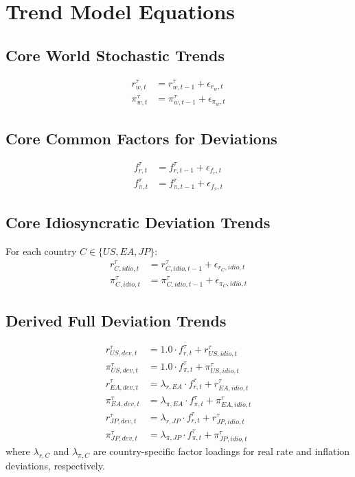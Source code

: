 \documentclass{article}
\begin{document}
\section*{Trend Model Equations}

\subsection*{Core World Stochastic Trends}
\begin{align}
r_{w,t}^{\tau} &= r_{w,t-1}^{\tau} + \epsilon_{r_w,t} \\
\pi_{w,t}^{\tau} &= \pi_{w,t-1}^{\tau} + \epsilon_{\pi_w,t}
\end{align}

\subsection*{Core Common Factors for Deviations}
\begin{align}
f_{r,t}^{\tau} &= f_{r,t-1}^{\tau} + \epsilon_{f_r,t} \\
f_{\pi,t}^{\tau} &= f_{\pi,t-1}^{\tau} + \epsilon_{f_\pi,t}
\end{align}

\subsection*{Core Idiosyncratic Deviation Trends}
For each country $C \in \{US, EA, JP\}$:
\begin{align}
r_{C,idio,t}^{\tau} &= r_{C,idio,t-1}^{\tau} + \epsilon_{r_C,idio,t} \\
\pi_{C,idio,t}^{\tau} &= \pi_{C,idio,t-1}^{\tau} + \epsilon_{\pi_C,idio,t}
\end{align}

\subsection*{Derived Full Deviation Trends}
\begin{align}
r_{US,dev,t}^{\tau} &= 1.0 \cdot f_{r,t}^{\tau} + r_{US,idio,t}^{\tau} \\
\pi_{US,dev,t}^{\tau} &= 1.0 \cdot f_{\pi,t}^{\tau} + \pi_{US,idio,t}^{\tau} \\
r_{EA,dev,t}^{\tau} &= \lambda_{r,EA} \cdot f_{r,t}^{\tau} + r_{EA,idio,t}^{\tau} \\
\pi_{EA,dev,t}^{\tau} &= \lambda_{\pi,EA} \cdot f_{\pi,t}^{\tau} + \pi_{EA,idio,t}^{\tau} \\
r_{JP,dev,t}^{\tau} &= \lambda_{r,JP} \cdot f_{r,t}^{\tau} + r_{JP,idio,t}^{\tau} \\
\pi_{JP,dev,t}^{\tau} &= \lambda_{\pi,JP} \cdot f_{\pi,t}^{\tau} + \pi_{JP,idio,t}^{\tau}
\end{align}
where $\lambda_{r,C}$ and $\lambda_{\pi,C}$ are country-specific factor loadings for real rate and inflation deviations, respectively.
\end{document}
